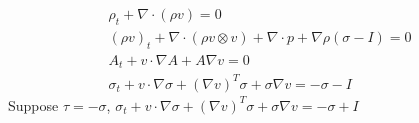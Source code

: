 \documentclass{article}
\begin{document}
\begin{subequations}
\begin{align}
\rho_t + \nabla \cdot (\rho v )=0 \\
(\rho v)_t + \nabla \cdot (\rho v \otimes v) + \nabla \cdot p + \nabla \rho( \sigma -I) = 0 \\
A_t + v \cdot \nabla A + A \nabla v = 0 \\
\sigma_t + v \cdot \nabla   \sigma + (\nabla v)^T \sigma +  \sigma \nabla v = -\sigma - I
\end{align}
\end{subequations}
Suppose $\tau = - \sigma$, $ \sigma_t + v \cdot \nabla   \sigma + (\nabla v)^T \sigma +  \sigma \nabla v  = -\sigma +I$
\end{document}

